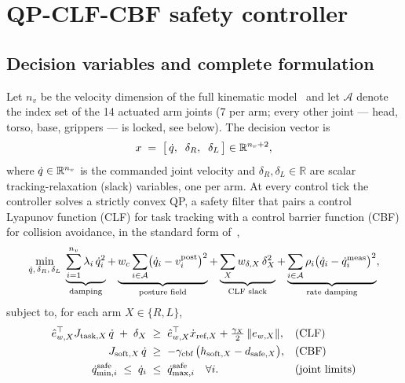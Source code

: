 \section{QP-CLF-CBF safety controller}
\label{sec:qp}

\subsection{Decision variables and complete formulation}

Let $n_v$ be the velocity dimension of the full kinematic model~\cite{carpentier2019} and let $\mathcal{A}$ denote the index set of the 14 actuated arm joints (7 per arm; every other joint --- head, torso, base, grippers --- is locked, see below). The decision vector is
\begin{equation}
x \;=\; \bigl[\,\dot{q},\;\; \delta_R,\;\; \delta_L\,\bigr] \in \mathbb{R}^{n_v+2},
\end{equation}
where $\dot{q} \in \mathbb{R}^{n_v}$ is the commanded joint velocity and $\delta_R,\delta_L \in \mathbb{R}$ are scalar tracking-relaxation (slack) variables, one per arm. At every control tick the controller solves a strictly convex QP, a safety filter that pairs a control Lyapunov function (CLF) for task tracking with a control barrier function (CBF) for collision avoidance, in the standard form of~\cite{ames2017cbf,ames2019ecc},
\begin{equation}
\label{eq:cost}
\min_{\dot{q},\,\delta_R,\,\delta_L}\;
\underbrace{\sum_{i=1}^{n_v}\lambda_i\,\dot{q}_i^{2}}_{\text{damping}}
+ \underbrace{w_c\sum_{i\in\mathcal{A}}\bigl(\dot{q}_i - v_i^{\text{post}}\bigr)^2}_{\text{posture field}}
+ \underbrace{\sum_{X} w_{\delta,X}\,\delta_X^2}_{\text{CLF slack}}
+ \underbrace{\sum_{i\in\mathcal{A}} \rho_i\bigl(\dot{q}_i - \dot{q}_i^{\text{meas}}\bigr)^2}_{\text{rate damping}},
\end{equation}
subject to, for each arm $X \in \{R, L\}$,
\begin{align}
\hat{e}_{w,X}^{\top} J_{\text{task},X}\,\dot{q} \;+\; \delta_X \;&\ge\; \hat{e}_{w,X}^{\top}\dot{x}_{\text{ref},X} + \tfrac{\gamma_X}{2}\,\|e_{w,X}\|, && \text{(CLF)} \label{eq:clf}\\
J_{\text{soft},X}\,\dot{q} \;&\ge\; -\gamma_{\text{cbf}}\,\bigl(h_{\text{soft},X} - d_{\text{safe},X}\bigr), && \text{(CBF)} \label{eq:cbf}\\
\dot{q}_{\min,i}^{\text{safe}} \;\le\; \dot{q}_i \;&\le\; \dot{q}_{\max,i}^{\text{safe}} \quad \forall i. && \text{(joint limits)} \label{eq:jl}
\end{align}
